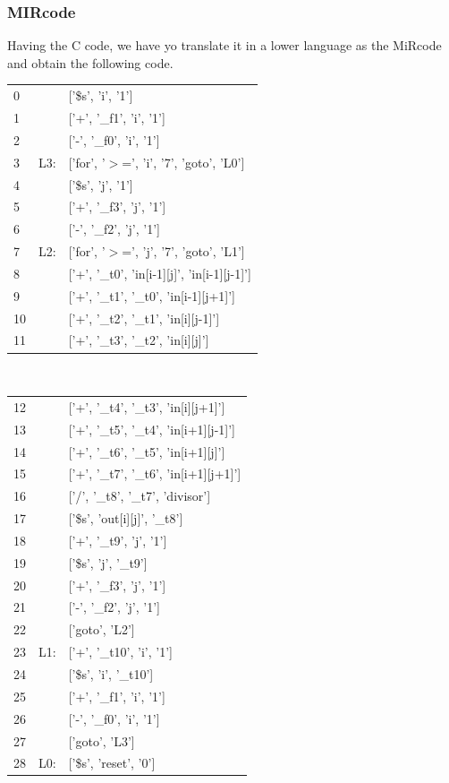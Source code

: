 {\subsubsection{MIRcode}
Having the C code, we have yo translate it in a lower language as the MiRcode and obtain the following code.\\
\begin{tabular}{l l l}
0   & &    ['\$s', 'i', '1'] \\
1     & &  ['+', '\_f1', 'i', '1']\\ 
2 & &      ['-', '\_f0', 'i', '1'] \\
3  & L3:& ['for', '$>$=', 'i', '7', 'goto', 'L0']\\ 
4 & &      ['\$s', 'j', '1'] \\
5    & &   ['+', '\_f3', 'j', '1'] \\
6       & &['-', '\_f2', 'j', '1'] \\
7   &L2:& ['for', '$>$=', 'j', '7', 'goto', 'L1'] \\
8   & &    ['+', '\_t0', 'in[i-1][j]', 'in[i-1][j-1]'] \\
9  & &     ['+', '\_t1', '\_t0', 'in[i-1][j+1]'] \\
10    & &  ['+', '\_t2', '\_t1', 'in[i][j-1]']\\
11& &   ['+', '\_t3', '\_t2', 'in[i][j]']\\
\end{tabular}\\
\begin{tabular}{l l l}
12& &   ['+', '\_t4', '\_t3', 'in[i][j+1]']\\
13& &   ['+', '\_t5', '\_t4', 'in[i+1][j-1]']\\
14& &   ['+', '\_t6', '\_t5', 'in[i+1][j]']\\
15 & &  ['+', '\_t7', '\_t6', 'in[i+1][j+1]']\\ 
16 & &  ['/', '\_t8', '\_t7', 'divisor'] \\
17 & &  ['\$s', 'out[i][j]', '\_t8'] \\
18 & &  ['+', '\_t9', 'j', '1'] \\
19 & &  ['\$s', 'j', '\_t9'] \\
20 & &  ['+', '\_f3', 'j', '1']\\
21 & &  ['-', '\_f2', 'j', '1'] \\
22 & &  ['goto', 'L2']\\
23  &L1:& ['+', '\_t10', 'i', '1']\\
24 & &  ['\$s', 'i', '\_t10'] \\
25 & &  ['+', '\_f1', 'i', '1']\\
26 & &  ['-', '\_f0', 'i', '1']\\
27 & &  ['goto', 'L3']\\
28  &L0:& ['\$s', 'reset', '0']\\


\end{tabular}}
